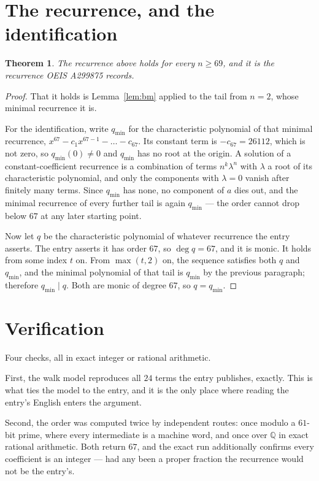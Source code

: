 \documentclass[11pt,a4paper]{article}
\theoremstyle{plain}
\newtheorem{theorem}{Theorem}
\theoremstyle{definition}
\begin{document}
\section{The recurrence, and the identification}

\begin{theorem}
The recurrence above holds for every $n\ge69$, and it is the recurrence OEIS A299875 records.
\end{theorem}

\begin{proof}
That it holds is Lemma~\ref{lem:bm} applied to the tail from $n=2$, whose minimal
recurrence it is.

For the identification, write $q_{\min}$ for the characteristic polynomial of that minimal
recurrence, $x^{67}-c_1x^{67-1}-\dots-c_{67}$. Its constant term is
$-c_{67}=26112$, which is not zero, so $q_{\min}(0)\neq0$ and $q_{\min}$ has no
root at the origin. A solution of a constant-coefficient recurrence is a combination of terms
$n^{k}\lambda^{n}$ with $\lambda$ a root of its characteristic polynomial, and only the
components with $\lambda=0$ vanish after finitely many terms. Since $q_{\min}$ has none, no
component of $a$ dies out, and the minimal recurrence of every further tail is again
$q_{\min}$ --- the order cannot drop below $67$ at any later starting point.

Now let $q$ be the characteristic polynomial of whatever recurrence the entry asserts. The
entry asserts it has order $67$, so $\deg q=67$, and it is monic. It holds from some
index $t$ on. From $\max(t,2)$ on, the sequence satisfies both $q$ and $q_{\min}$, and
the minimal polynomial of that tail is $q_{\min}$ by the previous paragraph; therefore
$q_{\min}\mid q$. Both are monic of degree $67$, so $q=q_{\min}$.
\end{proof}

\section{Verification}

Four checks, all in exact integer or rational arithmetic.

First, the walk model reproduces all $24$ terms the entry publishes, exactly. This is
what ties the model to the entry, and it is the only place where reading the entry's English
enters the argument.

Second, the order was computed twice by independent routes: once modulo a $61$-bit prime, where
every intermediate is a machine word, and once over $\mathbb{Q}$ in exact rational arithmetic.
Both return $67$, and the exact run additionally confirms every coefficient is an integer
--- had any been a proper fraction the recurrence would not be the entry's.
\end{document}
